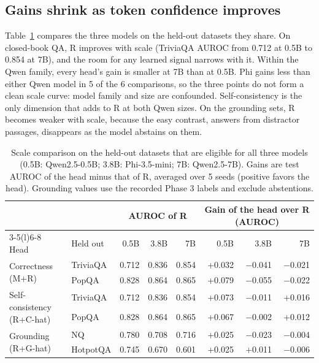 \documentclass[10pt]{article}
\begin{document}
\subsection{Gains shrink as token confidence improves}
\label{sec:scale}

Table~\ref{tab:scale} compares the three models on the held-out datasets they share. On closed-book QA, R improves with scale (TriviaQA AUROC from 0.712 at 0.5B to 0.854 at 7B), and the room for any learned signal narrows with it. Within the Qwen family, every head's gain is smaller at 7B than at 0.5B. Phi gains less than either Qwen model in 5 of the 6 comparisons, so the three points do not form a clean scale curve: model family and size are confounded. Self-consistency is the only dimension that adds to R at both Qwen sizes. On the grounding sets, R becomes weaker with scale, because the easy contrast, answers from distractor passages, disappears as the model abstains on them.

\begin{table}[t]
\centering
\small
\begin{tabular}{@{}llrrrrrr@{}}
\toprule
 & & \multicolumn{3}{c}{AUROC of R} & \multicolumn{3}{c}{Gain of the head over R (AUROC)} \\
\cmidrule(lr){3-5}\cmidrule(l){6-8}
Head & Held out & 0.5B & 3.8B & 7B & 0.5B & 3.8B & 7B \\
\midrule
\multirow{2}{*}{Correctness (M+R)} & TriviaQA & 0.712 & 0.836 & 0.854 & +0.032 & $-$0.041 & $-$0.021 \\
 & PopQA & 0.828 & 0.864 & 0.865 & +0.079 & $-$0.055 & $-$0.022 \\
\multirow{2}{*}{Self-consistency (R+C-hat)} & TriviaQA & 0.712 & 0.836 & 0.854 & +0.073 & $-$0.011 & +0.016 \\
 & PopQA & 0.828 & 0.864 & 0.865 & +0.067 & $-$0.002 & +0.012 \\
\multirow{2}{*}{Grounding (R+G-hat)} & NQ & 0.780 & 0.708 & 0.716 & +0.025 & $-$0.023 & $-$0.004 \\
 & HotpotQA & 0.745 & 0.670 & 0.601 & +0.025 & +0.011 & $-$0.006 \\
\bottomrule
\end{tabular}
\caption{Scale comparison on the held-out datasets that are eligible for all three models (0.5B: Qwen2.5-0.5B; 3.8B: Phi-3.5-mini; 7B: Qwen2.5-7B). Gains are test AUROC of the head minus that of R, averaged over 5 seeds (positive favors the head). Grounding values use the recorded Phase 3 labels and exclude abstentions.}
\label{tab:scale}
\end{table}
\end{document}
